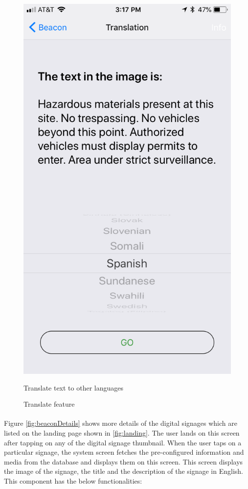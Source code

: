 \documentclass[12pt]{article}
\begin{document}
\begin{figure} [H]
\begin{minipage}{.5\textwidth}
  \includegraphics[width=0.9\linewidth]{media/beacon2.PNG}
  \caption{Translate feature}{Translate text to other languages}
  \label{fig:beaconTranslate}
\end{minipage}
\end{figure}


\paragraph{}Figure \ref{fig:beaconDetails} shows more details of the digital signages which are listed on the landing page shown in \ref{fig:landing}. The user lands on this screen after tapping on any of the digital signage thumbnail. When the user taps on a particular signage, the system screen fetches the pre-configured information and media from the database and displays them on this screen. This screen displays the image of the signage, the title and the description of the signage in English. This component  has the below functionalities:
\end{document}
